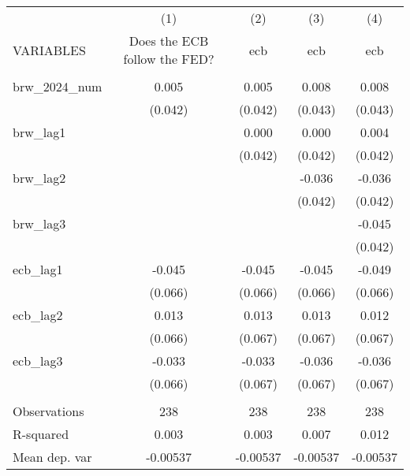 \documentclass[]{article}
\begin{document}
\begin{tabular}{lcccc} \hline
 & (1) & (2) & (3) & (4) \\
VARIABLES & Does the ECB follow the FED? & ecb & ecb & ecb \\ \hline
 &  &  &  &  \\
brw\_2024\_num & 0.005 & 0.005 & 0.008 & 0.008 \\
 & (0.042) & (0.042) & (0.043) & (0.043) \\
brw\_lag1 &  & 0.000 & 0.000 & 0.004 \\
 &  & (0.042) & (0.042) & (0.042) \\
brw\_lag2 &  &  & -0.036 & -0.036 \\
 &  &  & (0.042) & (0.042) \\
brw\_lag3 &  &  &  & -0.045 \\
 &  &  &  & (0.042) \\
ecb\_lag1 & -0.045 & -0.045 & -0.045 & -0.049 \\
 & (0.066) & (0.066) & (0.066) & (0.066) \\
ecb\_lag2 & 0.013 & 0.013 & 0.013 & 0.012 \\
 & (0.066) & (0.067) & (0.067) & (0.067) \\
ecb\_lag3 & -0.033 & -0.033 & -0.036 & -0.036 \\
 & (0.066) & (0.067) & (0.067) & (0.067) \\
 &  &  &  &  \\
Observations & 238 & 238 & 238 & 238 \\
R-squared & 0.003 & 0.003 & 0.007 & 0.012 \\
 Mean dep. var & -0.00537 & -0.00537 & -0.00537 & -0.00537 \\ \hline
\end{tabular}
\end{document}
